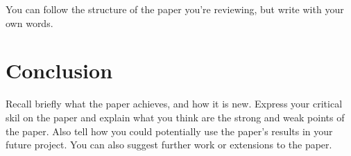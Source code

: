 \documentclass[11pt,a4paper]{article}
\begin{document}
You can follow the structure of the paper you're reviewing, but write with your own words.

\section{Conclusion}
Recall  briefly what the paper achieves, and how it is new. Express your critical skil on the paper and explain what you think are the strong and weak points of the paper. Also tell how you could potentially use the paper's results in your future project. You can also suggest further work or extensions to the paper.




\end{document}
